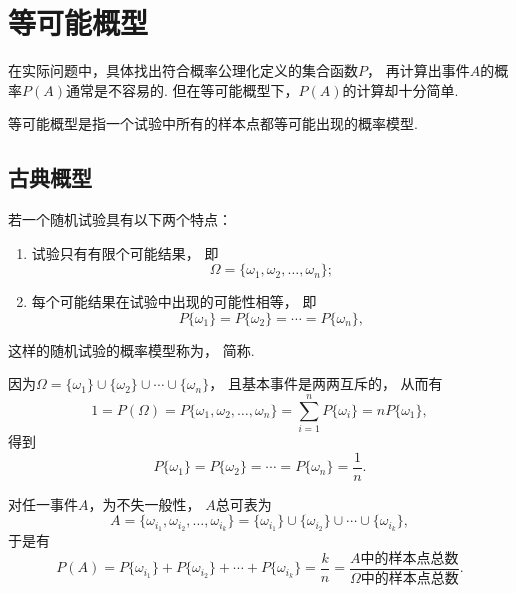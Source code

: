\section{等可能概型}
在实际问题中，具体找出符合概率公理化定义的集合函数\(P\)，
再计算出事件\(A\)的概率\(P(A)\)通常是不容易的.
但在等可能概型下，\(P(A)\)的计算却十分简单.

等可能概型是指一个试验中所有的样本点都等可能出现的概率模型.
\subsection{古典概型}
\begin{definition}
若一个随机试验具有以下两个特点：
\begin{enumerate}
	\item 试验只有有限个可能结果，
	即\begin{equation*}
		\Omega = \{\omega_1, \omega_2, \dotsc, \omega_n\};
	\end{equation*}

	\item 每个可能结果在试验中出现的可能性相等，
	即\begin{equation*}
		P\{\omega_1\} = P\{\omega_2\} = \dotsb = P\{\omega_n\},
	\end{equation*}
\end{enumerate}
这样的随机试验的概率模型称为，
简称.
\end{definition}

因为\(\Omega = \{\omega_1\}\cup\{\omega_2\}\cup\dotsb\cup\{\omega_n\}\)，
且基本事件是两两互斥的，
从而有\begin{equation*}
	1 = P(\Omega) = P\{\omega_1, \omega_2, \dotsc, \omega_n\}
	= \sum_{i=1}^n P\{\omega_i\}
	= n P\{\omega_1\},
\end{equation*}
得到\begin{equation*}
	P\{\omega_1\} = P\{\omega_2\} = \dotsb = P\{\omega_n\} = \frac{1}{n}.
\end{equation*}

对任一事件\(A\)，为不失一般性，
\(A\)总可表为\begin{equation*}
	A = \{\omega_{i_1},\omega_{i_2},\dotsc,\omega_{i_k}\}
	= \{\omega_{i_1}\}\cup\{\omega_{i_2}\}\cup\dotsb\cup\{\omega_{i_k}\},
\end{equation*}
于是有\begin{equation*}
	P(A) = P\{\omega_{i_1}\} + P\{\omega_{i_2}\} + \dotsb + P\{\omega_{i_k}\}
	= \frac{k}{n} = \frac{A \text{中的样本点总数}}{\Omega \text{中的样本点总数}}.
\end{equation*}

